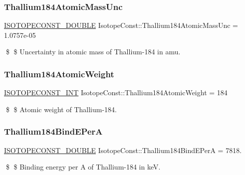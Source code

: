 \subsubsection{\texorpdfstring{Thallium184\+Atomic\+Mass\+Unc}{Thallium184AtomicMassUnc}}
{\footnotesize\ttfamily \mbox{\hyperlink{group___isotope_const-_macros_ga8f45a7272ce02c0b4c65c44636ed719a}{I\+S\+O\+T\+O\+P\+E\+C\+O\+N\+S\+T\+\_\+\+D\+O\+U\+B\+LE}} Isotope\+Const\+::\+Thallium184\+Atomic\+Mass\+Unc = 1.\+0757e-\/05}

\$ \$ Uncertainty in atomic mass of Thallium-\/184 in amu. \mbox{\label{group___isotope_const-_thallium-_tl184_gaea1f33d72f96b48d2d6aa67c52e92e88}} 
\subsubsection{\texorpdfstring{Thallium184\+Atomic\+Weight}{Thallium184AtomicWeight}}
{\footnotesize\ttfamily \mbox{\hyperlink{group___isotope_const-_macros_ga5f18360b3e99483a35c32d789e62621c}{I\+S\+O\+T\+O\+P\+E\+C\+O\+N\+S\+T\+\_\+\+I\+NT}} Isotope\+Const\+::\+Thallium184\+Atomic\+Weight = 184}

\$ \$ Atomic weight of Thallium-\/184. \mbox{\label{group___isotope_const-_thallium-_tl184_ga50777e69a72fd8d2aab103962f7464f6}} 
\subsubsection{\texorpdfstring{Thallium184\+Bind\+E\+PerA}{Thallium184BindEPerA}}
{\footnotesize\ttfamily \mbox{\hyperlink{group___isotope_const-_macros_ga8f45a7272ce02c0b4c65c44636ed719a}{I\+S\+O\+T\+O\+P\+E\+C\+O\+N\+S\+T\+\_\+\+D\+O\+U\+B\+LE}} Isotope\+Const\+::\+Thallium184\+Bind\+E\+PerA = 7818.}

\$ \$ Binding energy per A of Thallium-\/184 in keV. \mbox{\label{group___isotope_const-_thallium-_tl184_gacebe5d7e98676560061afe87269359b8}} 
